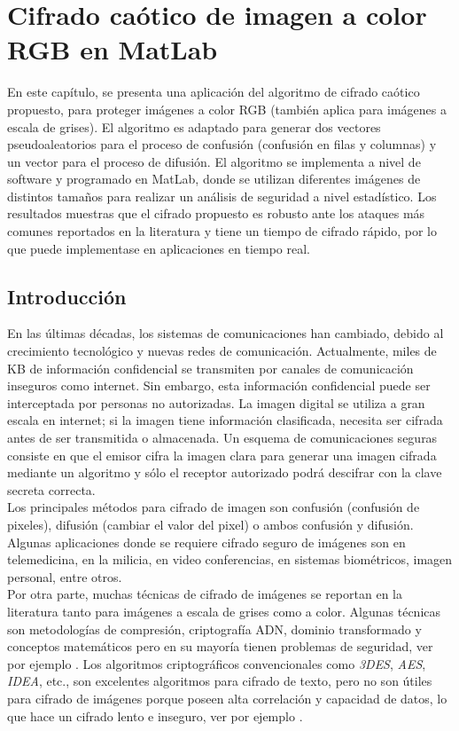 
\chapter{Cifrado caótico de imagen a color RGB en MatLab}
En este capítulo, se presenta una aplicación del algoritmo de cifrado caótico propuesto, para proteger imágenes a color RGB (también aplica para imágenes a escala de grises). El algoritmo es adaptado para generar dos vectores pseudoaleatorios para el proceso de confusión (confusión en filas y columnas) y un vector para el proceso de difusión. El algoritmo se implementa a nivel de software y programado en MatLab, donde se utilizan diferentes imágenes de distintos tamaños para realizar un análisis de seguridad a nivel estadístico. Los resultados muestras que el cifrado propuesto es robusto ante los ataques más comunes reportados en la literatura y tiene un tiempo de cifrado rápido, por lo que puede implementase en aplicaciones en tiempo real.     

\section{Introducción}
En las últimas décadas, los sistemas de comunicaciones han cambiado, debido al crecimiento tecnológico y nuevas redes de comunicación. Actualmente, miles de KB de información confidencial se transmiten por canales de comunicación inseguros como internet. Sin embargo, esta información confidencial puede ser interceptada por personas no autorizadas. La imagen digital se utiliza a gran escala en internet; si la imagen tiene información clasificada, necesita ser cifrada antes de ser transmitida o almacenada. Un esquema de comunicaciones seguras consiste en que el emisor cifra la imagen clara para generar una imagen cifrada mediante un algoritmo y sólo el receptor autorizado podrá descifrar con la clave secreta correcta. \\

Los principales métodos para cifrado de imagen son confusión (confusión de pixeles), difusión (cambiar el valor del pixel) o ambos confusión y difusión. Algunas aplicaciones donde se requiere cifrado seguro de imágenes son en telemedicina, en la milicia, en video conferencias, en sistemas biométricos, imagen personal, entre otros. \\ 

Por otra parte, muchas técnicas de cifrado de imágenes se reportan en la literatura tanto para imágenes a escala de grises como a color. Algunas técnicas son metodologías de compresión, criptografía ADN, dominio transformado y conceptos matemáticos pero en su mayoría tienen problemas de seguridad, ver por ejemplo \cite{ZEtAl_2012}. Los algoritmos criptográficos convencionales como \textit{3DES}, \textit{AES}, \textit{IDEA}, etc., son excelentes algoritmos para cifrado de texto, pero no son útiles para cifrado de imágenes porque poseen alta correlación y capacidad de datos, lo que hace un cifrado lento e inseguro, ver por ejemplo \cite{DyC_2000, CEtAl_2004, MEtAl_2007, MEtAl_2009}. \\

